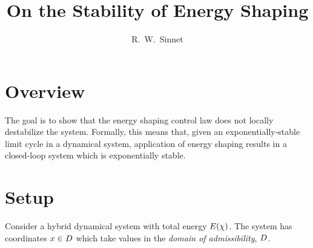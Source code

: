 \documentclass[twocolumn]{article}
\author{R.~W.~Sinnet}
\title{On the Stability of Energy Shaping}
\begin{document}
\maketitle
\thispagestyle{fancy}

\section*{Overview}
The goal is to show that the energy shaping control law does not locally destabilize the system.
%
Formally, this means that, given an exponentially-stable limit cycle in a dynamical system, application of energy shaping results in a closed-loop system which is exponentially stable.

\section{Setup}

Consider a hybrid dynamical system with total energy $E(\chi)$.
%
The system has coordinates $x \in D$ which take values in the {\em domain of admissibility}, $D$.
\end{document}
